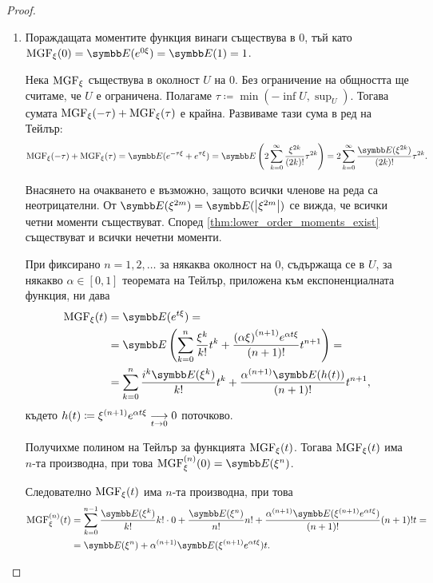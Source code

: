 \documentclass[
  headings=standardclasses,
  bibliography=totocnumbered,
]{scrartcl}
\begin{document}
\begin{proof}
  \mbox{}
  \begin{enumerate}
    \item Пораждащата моментите функция винаги съществува в \( 0 \), тъй като \( \MGF_\xi(0) = \Expect(e^{0\xi}) = \Expect(1) = 1 \).

    Нека \( \MGF_\xi \) съществува в околност \( U \) на \( 0 \). Без ограничение на общността ще считаме, че \( U \) е ограничена. Полагаме \( \tau \coloneqq \min(-\inf U, \sup_U) \). Тогава сумата \( \MGF_\xi(-\tau) + \MGF_\xi(\tau) \) е крайна. Развиваме тази сума в ред на Тейлър:
    \begin{equation*}
      \MGF_\xi(-\tau) + \MGF_\xi(\tau)
      =
      \Expect(e^{-\tau\xi} + e^{\tau\xi})
      =
      \Expect\left( 2 \sum_{k=0}^\infty \frac {\xi^{2k}} {(2k)!} \tau^{2k} \right)
      =
      2 \sum_{k=0}^\infty \frac {\Expect(\xi^{2k})} {(2k)!} \tau^{2k}.
    \end{equation*}

    Внасянето на очакването е възможно, защото всички членове на реда са неотрицателни. От \( \Expect(\xi^{2m}) = \Expect(\Abs{\xi^{2m}}) \) се вижда, че всички четни моменти съществуват. Според \cref{thm:lower_order_moments_exist} съществуват и всички нечетни моменти.

    При фиксирано \( n = 1, 2, \ldots \) за някаква околност на \( 0 \), съдържаща се в \( U \), за някакво \( \alpha \in [0, 1] \) теоремата на Тейлър, приложена към експоненциалната функция, ни дава
    \begin{align*}
      \MGF_\xi(t)
      &=
      \Expect(e^{t\xi})
      = \\ &=
      \Expect\left(\sum_{k=0}^n \frac {\xi^k} {k!} t^k + \frac {{(\alpha \xi)}^{(n+1)} e^{\alpha t \xi}} {(n+1)!} t^{n+1} \right)
      = \\ &=
      \sum_{k=0}^n \frac {i^k \Expect(\xi^k)} {k!} t^k + \frac {{\alpha}^{(n+1)} \Expect(h(t))} {(n+1)!} t^{n+1},
    \end{align*}
    където \( h(t) \coloneqq \xi^{(n+1)} e^{\alpha t \xi} \Conv[t \to 0]{} 0 \) поточково.

    Получихме полином на Тейлър за функцията \( \MGF_\xi(t) \). Тогава \( \MGF_\xi(t) \) има \( n \)-та производна, при това \( \MGF^{(n)}_\xi(0) = \Expect(\xi^n) \).

    Следователно \( \MGF_\xi(t) \) има \( n \)-та производна, при това
    \begin{align*}
      \MGF^{(n)}_\xi(t)
      &=
      \sum_{k=0}^{n-1} \frac {\Expect(\xi^k)} {k!} k! \cdot 0 + \frac {\Expect(\xi^n)} {n!} n! + \frac {\alpha^{(n+1)} \Expect(\xi^{(n+1)} e^{\alpha t \xi})} {(n+1)!} (n+1)! t
      = \\ &=
      \Expect(\xi^n) + \alpha^{(n+1)} \Expect(\xi^{(n+1)} e^{\alpha t \xi}) t.
    \end{align*}


\end{enumerate}
\end{proof}
\end{document}
